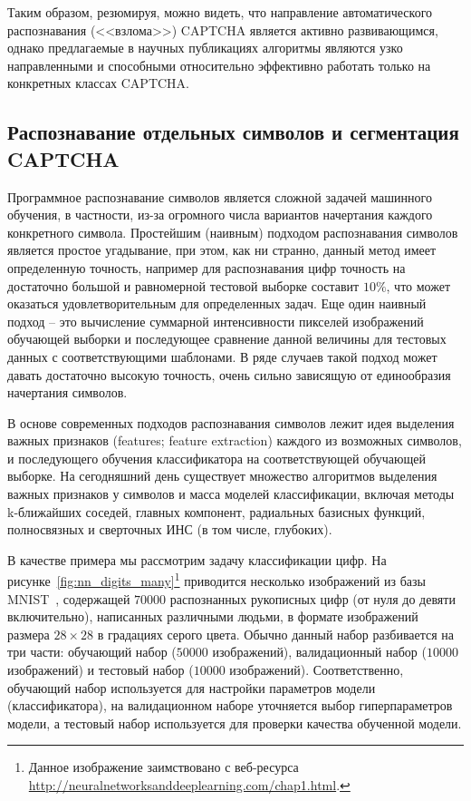 \documentclass[a4paper,12pt,russian]{article} %
\begin{document}
Таким образом, резюмируя, можно видеть, что направление автоматического распознавания (<<взлома>>) CAPTCHA является активно развивающимся, однако предлагаемые в научных публикациях алгоритмы являются узко направленными и способными относительно эффективно работать только на конкретных классах CAPTCHA.

\newpage
\subsection{Распознавание отдельных символов и сегментация CAPTCHA} \label{ss:captheory_symb}

Программное распознавание символов является сложной задачей машинного обучения, в частности, из-за огромного числа вариантов начертания каждого конкретного символа.
Простейшим (наивным) подходом распознавания символов является простое угадывание, при этом, как ни странно, данный метод имеет определенную точность, например для распознавания цифр точность на достаточно большой и равномерной тестовой выборке составит $10\%$, что может оказаться удовлетворительным для определенных задач.
Еще один наивный подход -- это вычисление суммарной интенсивности пикселей изображений обучающей выборки и последующее сравнение данной величины для тестовых данных с соответствующими шаблонами.
В ряде случаев такой подход может давать достаточно высокую точность, очень сильно зависящую от единообразия начертания символов.

В основе современных подходов распознавания символов лежит идея выделения важных признаков (features; feature extraction) каждого из возможных символов, и последующего обучения классификатора на соответствующей обучающей выборке.
На сегодняшний день существует множество алгоритмов выделения важных признаков у символов и масса моделей классификации, включая методы k-ближайших соседей, главных компонент, радиальных базисных функций, полносвязных и сверточных ИНС (в том числе, глубоких).

В качестве примера мы рассмотрим задачу классификации цифр.
На рисунке~\ref{fig:nn_digits_many}\footnote{
	Данное изображение заимствовано с веб-ресурса \url{http://neuralnetworksanddeeplearning.com/chap1.html}.
}
приводится несколько изображений из базы MNIST~\cite{lecun1998mnist}, содержащей $70000$ распознанных рукописных цифр (от нуля до девяти включительно), написанных различными людьми, в формате изображений размера $28 \times 28$ в градациях серого цвета.
Обычно данный набор разбивается на три части: обучающий набор ($50000$ изображений), валидационный набор ($10000$ изображений) и тестовый набор ($10000$ изображений).
Соответственно, обучающий набор используется для настройки параметров модели (классификатора), на валидационном наборе уточняется выбор гиперпараметров модели, а тестовый набор используется для проверки качества обученной модели.
\end{document}
